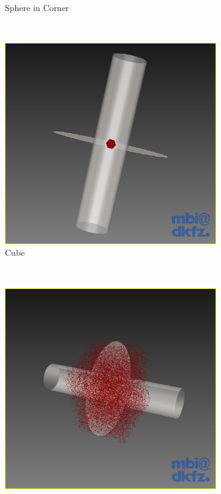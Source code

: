 \begin{figure}[H]
\begin{subfigure}[b]{0.5\textwidth}
    \caption{Sphere in Corner}
    \label{fig:nextscanplanespherecorner}
  \end{subfigure}
  ~%
  \begin{subfigure}[b]{0.5\textwidth}
    \includegraphics[width=\textwidth]{images/next_scan_plane/cube.png}
    \caption{Cube}
    \label{fig:nextscanplanecube}  
  \end{subfigure}%
  ~ %
  \begin{subfigure}[b]{0.5\textwidth}
    \includegraphics[width=\textwidth]{images/next_scan_plane/random.png}

\end{subfigure}
\end{figure}
